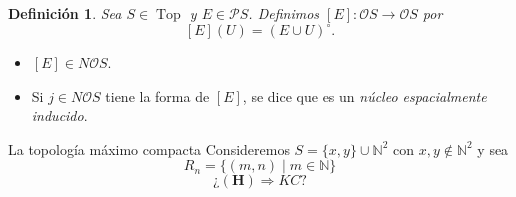 \documentclass[compress,12pt]{beamer}
\DeclareMathOperator{\Top}{Top}
\newtheorem{dfn}{Definición}
\begin{document}
\begin{frame}
\begin{dfn}
Sea $S\in \Top$ y $E\in \mathcal{P}S$. Definimos $[E]\colon \mathcal{O}S\to \mathcal{O}S$ por
\[
[E](U)=(E\cup U)^\circ.
\]
\end{dfn}
\begin{itemize}
    \item<2-> $[E]\in N\mathcal{O}S$.
    \item<3-> Si $j\in N\mathcal{O}S$ tiene la forma de $[E]$, se dice que es un \emph{núcleo espacialmente inducido}. 
\end{itemize}
\end{frame}

\begin{frame}{La topología máximo compacta}
Consideremos $S=\{x,y\}\cup \mathbb{N}^2$ con $x,y\notin \mathbb{N}^2$ y sea 
\[
R_n=\{(m,n)\mid m\in \mathbb{N}\}
\]
\[
¿\mathbf{(H)}\Rightarrow KC?
\]
\end{frame}

\End
\end{document}
